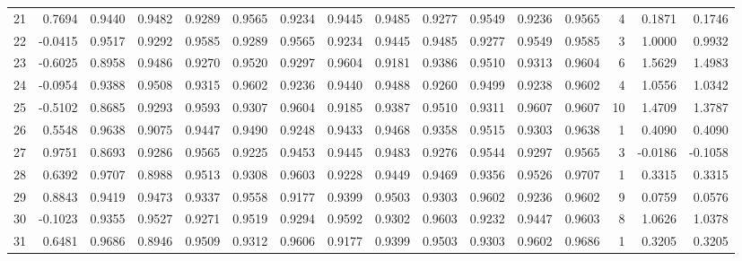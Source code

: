 \begin{tabular}{lrrrrrrrrrrrrrrr}
21  &      0.7694 &  0.9440 &  0.9482 &  0.9289 &  0.9565 &  0.9234 &  0.9445 &  0.9485 &  0.9277 &  0.9549 &   0.9236 &     0.9565 &      4 &                    0.1871 &                     0.1746 \\
22  &     -0.0415 &  0.9517 &  0.9292 &  0.9585 &  0.9289 &  0.9565 &  0.9234 &  0.9445 &  0.9485 &  0.9277 &   0.9549 &     0.9585 &      3 &                    1.0000 &                     0.9932 \\
23  &     -0.6025 &  0.8958 &  0.9486 &  0.9270 &  0.9520 &  0.9297 &  0.9604 &  0.9181 &  0.9386 &  0.9510 &   0.9313 &     0.9604 &      6 &                    1.5629 &                     1.4983 \\
24  &     -0.0954 &  0.9388 &  0.9508 &  0.9315 &  0.9602 &  0.9236 &  0.9440 &  0.9488 &  0.9260 &  0.9499 &   0.9238 &     0.9602 &      4 &                    1.0556 &                     1.0342 \\
25  &     -0.5102 &  0.8685 &  0.9293 &  0.9593 &  0.9307 &  0.9604 &  0.9185 &  0.9387 &  0.9510 &  0.9311 &   0.9607 &     0.9607 &     10 &                    1.4709 &                     1.3787 \\
26  &      0.5548 &  0.9638 &  0.9075 &  0.9447 &  0.9490 &  0.9248 &  0.9433 &  0.9468 &  0.9358 &  0.9515 &   0.9303 &     0.9638 &      1 &                    0.4090 &                     0.4090 \\
27  &      0.9751 &  0.8693 &  0.9286 &  0.9565 &  0.9225 &  0.9453 &  0.9445 &  0.9483 &  0.9276 &  0.9544 &   0.9297 &     0.9565 &      3 &                   -0.0186 &                    -0.1058 \\
28  &      0.6392 &  0.9707 &  0.8988 &  0.9513 &  0.9308 &  0.9603 &  0.9228 &  0.9449 &  0.9469 &  0.9356 &   0.9526 &     0.9707 &      1 &                    0.3315 &                     0.3315 \\
29  &      0.8843 &  0.9419 &  0.9473 &  0.9337 &  0.9558 &  0.9177 &  0.9399 &  0.9503 &  0.9303 &  0.9602 &   0.9236 &     0.9602 &      9 &                    0.0759 &                     0.0576 \\
30  &     -0.1023 &  0.9355 &  0.9527 &  0.9271 &  0.9519 &  0.9294 &  0.9592 &  0.9302 &  0.9603 &  0.9232 &   0.9447 &     0.9603 &      8 &                    1.0626 &                     1.0378 \\
31  &      0.6481 &  0.9686 &  0.8946 &  0.9509 &  0.9312 &  0.9606 &  0.9177 &  0.9399 &  0.9503 &  0.9303 &   0.9602 &     0.9686 &      1 &                    0.3205 &                     0.3205 \\

\end{tabular}

